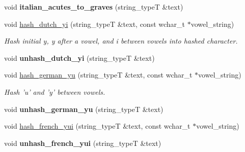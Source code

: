 \begin{DoxyCompactItemize}
\item 
\hypertarget{group___stemming_ga85e349feabc837fa38ceb40cbfe8f16e}{void {\bfseries italian\-\_\-acutes\-\_\-to\-\_\-graves} (string\-\_\-type\-T \&text)}\label{group___stemming_ga85e349feabc837fa38ceb40cbfe8f16e}

\item 
\hypertarget{group___stemming_gad7324f61a80140d122da1c087289b737}{void \hyperlink{group___stemming_gad7324f61a80140d122da1c087289b737}{hash\-\_\-dutch\-\_\-yi} (string\-\_\-type\-T \&text, const wchar\-\_\-t $\ast$vowel\-\_\-string)}\label{group___stemming_gad7324f61a80140d122da1c087289b737}

\begin{DoxyCompactList}\small\item\em Hash initial y, y after a vowel, and i between vowels into hashed character. \end{DoxyCompactList}\item 
\hypertarget{group___stemming_ga00a03f9e29573b89ff269e3832aa019b}{void {\bfseries unhash\-\_\-dutch\-\_\-yi} (string\-\_\-type\-T \&text)}\label{group___stemming_ga00a03f9e29573b89ff269e3832aa019b}

\item 
\hypertarget{group___stemming_ga2ab335f89cb2e65564a7985156d6ce19}{void \hyperlink{group___stemming_ga2ab335f89cb2e65564a7985156d6ce19}{hash\-\_\-german\-\_\-yu} (string\-\_\-type\-T \&text, const wchar\-\_\-t $\ast$vowel\-\_\-string)}\label{group___stemming_ga2ab335f89cb2e65564a7985156d6ce19}

\begin{DoxyCompactList}\small\item\em Hash 'u' and 'y' between vowels. \end{DoxyCompactList}\item 
\hypertarget{group___stemming_ga70ee7015775ebb7d8b98a1724f94448e}{void {\bfseries unhash\-\_\-german\-\_\-yu} (string\-\_\-type\-T \&text)}\label{group___stemming_ga70ee7015775ebb7d8b98a1724f94448e}

\item 
void \hyperlink{group___stemming_ga0fa77155cef02f4efa2a537450ef4004}{hash\-\_\-french\-\_\-yui} (string\-\_\-type\-T \&text, const wchar\-\_\-t $\ast$vowel\-\_\-string)
\item 
\hypertarget{group___stemming_ga11e5585424ce623ee7842a039bdfb7cb}{void {\bfseries unhash\-\_\-french\-\_\-yui} (string\-\_\-type\-T \&text)}\label{group___stemming_ga11e5585424ce623ee7842a039bdfb7cb}


\end{DoxyCompactItemize}
